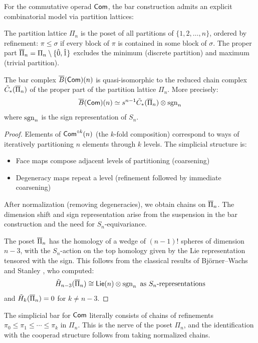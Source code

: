 For the commutative operad $\mathsf{Com}$, the bar construction admits an explicit combinatorial model via partition lattices:
 
\begin{definition}
The partition lattice $\Pi_n$ is the poset of all partitions of $\{1, 2, \ldots, n\}$, ordered by refinement: $\pi \leq \sigma$ if every block of $\pi$ is contained in some block of $\sigma$. The proper part $\overline{\Pi}_n = \Pi_n \setminus \{\hat{0}, \hat{1}\}$ excludes the minimum (discrete partition) and maximum (trivial partition).
\end{definition}
 
\begin{theorem}\label{thm:partition}
The bar complex $\overline{B}(\mathsf{Com})(n)$ is quasi-isomorphic to the reduced chain complex $\tilde{C}_*(\overline{\Pi}_n)$ of the proper part of the partition lattice $\Pi_n$. More precisely:
\[
\overline{B}(\mathsf{Com})(n) \simeq s^{n-1}\tilde{C}_{*}(\overline{\Pi}_n) \otimes \operatorname{sgn}_n
\]
where $\operatorname{sgn}_n$ is the sign representation of $S_n$.
\end{theorem}
 
\begin{proof}
Elements of $\mathsf{Com}^{\circ k}(n)$ (the $k$-fold composition) correspond to ways of iteratively partitioning $n$ elements through $k$ levels. The simplicial structure is:
\begin{itemize}
\item Face maps compose adjacent levels of partitioning (coarsening)
\item Degeneracy maps repeat a level (refinement followed by immediate coarsening)
\end{itemize}
 
After normalization (removing degeneracies), we obtain chains on $\overline{\Pi}_n$. The dimension shift and sign representation arise from the suspension in the bar construction and the need for $S_n$-equivariance.
 
The poset $\overline{\Pi}_n$ has the homology of a wedge of $(n-1)!$ spheres of dimension $n-3$, with the $S_n$-action on the top homology given by the Lie representation tensored with the sign. This follows from the classical results of Björner--Wachs \cite{BW83} and Stanley \cite{Sta97}, who computed:
\[
\tilde{H}_{n-3}(\overline{\Pi}_n) \cong \mathsf{Lie}(n) \otimes \operatorname{sgn}_n \text{ as } S_n\text{-representations}
\]
and $\tilde{H}_k(\overline{\Pi}_n) = 0$ for $k \neq n-3$.
\end{proof}
\begin{remark}
The simplicial bar for $\mathsf{Com}$ literally consists of chains of refinements $\pi_0 \leq \pi_1 \leq \cdots \leq \pi_k$ in $\Pi_n$. This is the nerve of the poset $\Pi_n$, and the identification with the cooperad structure follows from taking normalized chains.
\end{remark}
 
